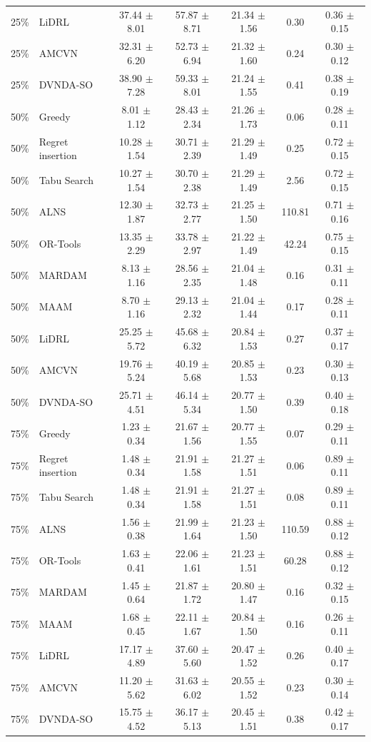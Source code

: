 \begin{tabular}{clccccc}
25\% & LiDRL & 37.44 $\pm$ 8.01 & 57.87 $\pm$ 8.71 & 21.34 $\pm$ 1.56 & 0.30 & 0.36 $\pm$ 0.15 \\
25\% & AMCVN & 32.31 $\pm$ 6.20 & 52.73 $\pm$ 6.94 & 21.32 $\pm$ 1.60 & 0.24 & 0.30 $\pm$ 0.12 \\
25\% & DVNDA-SO & 38.90 $\pm$ 7.28 & 59.33 $\pm$ 8.01 & 21.24 $\pm$ 1.55 & 0.41 & 0.38 $\pm$ 0.19 \\
50\% & Greedy & 8.01 $\pm$ 1.12 & 28.43 $\pm$ 2.34 & 21.26 $\pm$ 1.73 & 0.06 & 0.28 $\pm$ 0.11 \\
50\% & Regret insertion & 10.28 $\pm$ 1.54 & 30.71 $\pm$ 2.39 & 21.29 $\pm$ 1.49 & 0.25 & 0.72 $\pm$ 0.15 \\
50\% & Tabu Search & 10.27 $\pm$ 1.54 & 30.70 $\pm$ 2.38 & 21.29 $\pm$ 1.49 & 2.56 & 0.72 $\pm$ 0.15 \\
50\% & ALNS & 12.30 $\pm$ 1.87 & 32.73 $\pm$ 2.77 & 21.25 $\pm$ 1.50 & 110.81 & 0.71 $\pm$ 0.16 \\
50\% & OR-Tools & 13.35 $\pm$ 2.29 & 33.78 $\pm$ 2.97 & 21.22 $\pm$ 1.49 & 42.24 & 0.75 $\pm$ 0.15 \\
50\% & MARDAM & 8.13 $\pm$ 1.16 & 28.56 $\pm$ 2.35 & 21.04 $\pm$ 1.48 & 0.16 & 0.31 $\pm$ 0.11 \\
50\% & MAAM & 8.70 $\pm$ 1.16 & 29.13 $\pm$ 2.32 & 21.04 $\pm$ 1.44 & 0.17 & 0.28 $\pm$ 0.11 \\
50\% & LiDRL & 25.25 $\pm$ 5.72 & 45.68 $\pm$ 6.32 & 20.84 $\pm$ 1.53 & 0.27 & 0.37 $\pm$ 0.17 \\
50\% & AMCVN & 19.76 $\pm$ 5.24 & 40.19 $\pm$ 5.68 & 20.85 $\pm$ 1.53 & 0.23 & 0.30 $\pm$ 0.13 \\
50\% & DVNDA-SO & 25.71 $\pm$ 4.51 & 46.14 $\pm$ 5.34 & 20.77 $\pm$ 1.50 & 0.39 & 0.40 $\pm$ 0.18 \\
75\% & Greedy & 1.23 $\pm$ 0.34 & 21.67 $\pm$ 1.56 & 20.77 $\pm$ 1.55 & 0.07 & 0.29 $\pm$ 0.11 \\
75\% & Regret insertion & 1.48 $\pm$ 0.34 & 21.91 $\pm$ 1.58 & 21.27 $\pm$ 1.51 & 0.06 & 0.89 $\pm$ 0.11 \\
75\% & Tabu Search & 1.48 $\pm$ 0.34 & 21.91 $\pm$ 1.58 & 21.27 $\pm$ 1.51 & 0.08 & 0.89 $\pm$ 0.11 \\
75\% & ALNS & 1.56 $\pm$ 0.38 & 21.99 $\pm$ 1.64 & 21.23 $\pm$ 1.50 & 110.59 & 0.88 $\pm$ 0.12 \\
75\% & OR-Tools & 1.63 $\pm$ 0.41 & 22.06 $\pm$ 1.61 & 21.23 $\pm$ 1.51 & 60.28 & 0.88 $\pm$ 0.12 \\
75\% & MARDAM & 1.45 $\pm$ 0.64 & 21.87 $\pm$ 1.72 & 20.80 $\pm$ 1.47 & 0.16 & 0.32 $\pm$ 0.15 \\
75\% & MAAM & 1.68 $\pm$ 0.45 & 22.11 $\pm$ 1.67 & 20.84 $\pm$ 1.50 & 0.16 & 0.26 $\pm$ 0.11 \\
75\% & LiDRL & 17.17 $\pm$ 4.89 & 37.60 $\pm$ 5.60 & 20.47 $\pm$ 1.52 & 0.26 & 0.40 $\pm$ 0.17 \\
75\% & AMCVN & 11.20 $\pm$ 5.62 & 31.63 $\pm$ 6.02 & 20.55 $\pm$ 1.52 & 0.23 & 0.30 $\pm$ 0.14 \\
75\% & DVNDA-SO & 15.75 $\pm$ 4.52 & 36.17 $\pm$ 5.13 & 20.45 $\pm$ 1.51 & 0.38 & 0.42 $\pm$ 0.17 \\
\bottomrule
\end{tabular}
